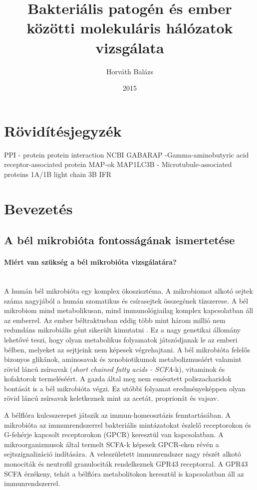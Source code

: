 \documentclass[a4paper,12pt]{article}
\title{Bakteriális patogén és ember közötti molekuláris hálózatok vizsgálata}
\author{Horváth Balázs}
\date{2015}
\begin{document}
\maketitle
\thispagestyle{empty}
\pagebreak

\setcounter{page}{1}
\tableofcontents


\pagebreak

\section{Rövidítésjegyzék}
PPI - protein protein interaction 
NCBI
GABARAP -Gamma-aminobutyric acid receptor-associated protein
MAP-ok
MAP1LC3B - Microtubule-associated proteins 1A/1B light chain 3B
IFR
\pagebreak

\section{Bevezetés}
	\subsection{A bél mikrobióta fontosságának ismertetése}
		\paragraph{Miért van szükség a bél mikrobióta vizsgálatára?} \mbox{}\\
		A humán bél mikrobióta egy komplex ökoszisztéma. A mikrobiomot alkotó sejtek száma nagyjából a humán szomatikus és csírasejtek összegének tízszerese.  A bél mikrobiom mind metabolikusan, mind immunológiailag komplex kapcsolatban áll az emberrel.\cite{gut_microbiome} Az ember béltraktusban eddig több mint három millió nem redundáns mikrobiális gént sikerült kimutatni \cite{meta_omics}. Ez a nagy genetikai állomány lehetővé teszi, hogy olyan metabolikus folyamatok játszódjanak le az emberi bélben, melyeket az sejtjeink nem képesek végrehajtani. \cite{gut_microbiome} A bél mikrobióta felelős bizonyos glikánok, aminosavak és xenobiotikumok metabolizmusáért valamint rövid láncú zsírsavak (\textit{short chained fatty acids - SCFA}-k), vitaminok és kofaktorok termeléséért. A gazda által meg nem emésztett poliszacharidok bontását is a bél mikrobióta végzi. Ez utóbbi folyamat eredményeképpen olyan rövid láncú zsírsavak keletkeznek mint az acetát, proprionát és vajsav. \cite{scfa_and_vitamine}
		
		A bélflóra kulcsszerepet játszik az immun-homeosztázis fenntartásában. A mikrobióta az immunrendszerrel bakteriális mintázatokat észlelő receptorokon és G-fehérje kapcsolt receptorokon (GPCR) keresztül van kapcsolatban. A mikroorganizmusok által termelt SCFA-k képesek GPCR-eken révén a sejtszignalizáció indítására. A veleszületett immunrendszer nagy részét alkotó monociták és neutrofil granulociták rendelkeznek GPR43 receptorral. A GPR43 SCFA érzékeny, tehát a bélflóra metabolitokon keresztül is kapcsolatban áll az immunrendszerrel. \cite{buthyrate_immune}
		
\end{document}
